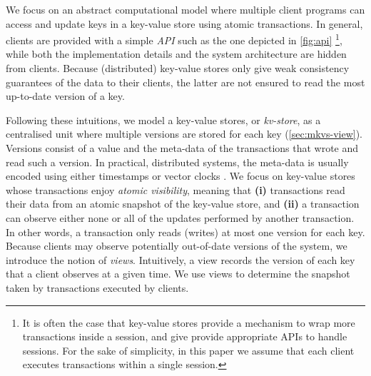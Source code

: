 We focus on an abstract computational model where multiple client programs can access and update keys in a key-value store using atomic transactions. 
In general, clients are provided with a simple \textit{API} such as the one depicted in \cref{fig:api} \cite{gdur,physicsnmsi,clockSI}\footnote{It is 
often the case that key-value stores provide a mechanism to wrap more transactions inside a session, and give 
provide appropriate APIs to handle sessions. For the sake of simplicity, in this paper we assume that each client executes transactions 
within a single session.}, while both the implementation details and the system architecture are hidden from clients. 
Because (distributed) key-value stores only give weak consistency guarantees of the data to their clients, the latter are 
not ensured to read the most up-to-date version of a key.

Following these intuitions, we model a key-value stores, or \emph{kv-store}, as a centralised unit where multiple versions 
are stored for each key (\cref{sec:mkvs-view}). Versions consist of a value and the meta-data of the transactions that wrote and 
read such a version. In practical, distributed systems, the meta-data is usually encoded using either timestamps 
\cite{physicsnmsi,clockSI} or vector clocks \cite{gdur}. We focus on key-value stores whose transactions 
enjoy \emph{atomic visibility}, meaning that \textbf{(i)} transactions read their data from an atomic 
snapshot of the key-value store, and \textbf{(ii)} a transaction can observe either none or all 
of the updates performed by another transaction. In other words, a transaction only reads (writes) at most 
one version for each key.
Because clients may observe potentially out-of-date versions of the system, we introduce the notion of \emph{views}. 
Intuitively, a view records the version of each key that a client observes at a given time. We use views 
to determine the snapshot taken by transactions executed by clients.

